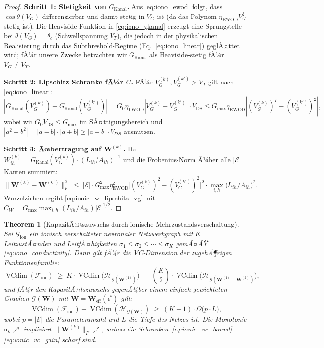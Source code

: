 ﻿\documentclass[12pt, a4paper, openany]{report}
\newtheorem{theorem}{Theorem}[chapter]
\newcommand{\calG}{\mathcal{G}}
\newcommand{\calH}{\mathcal{H}}
\newcommand{\calE}{\mathcal{E}}
\newcommand{\calF}{\mathcal{F}}
\DeclareMathOperator{\VC}{VCdim}
\begin{document}
\begin{proof}
\textbf{Schritt 1: Stetigkeit von $G_{\mathrm{Kanal}}$.}
Aus \eqref{eq:iono_ewod} folgt, dass $\cos\theta(V_G)$ differenzierbar
und damit stetig in $V_G$ ist (da das Polynom $\eta_{\mathrm{EWOD}} V_G^2$
stetig ist).  Die Heaviside-Funktion in \eqref{eq:iono_gkanal} erzeugt
eine Sprungstelle bei $\theta(V_G) = \theta_c$ (Schwellspannung $V_T$),
die jedoch in der physikalischen Realisierung durch das Subthreshold-Regime
(Eq.~\ref{eq:iono_linear}) geglÃ¤ttet wird; fÃ¼r unsere Zwecke betrachten
wir $G_{\mathrm{Kanal}}$ als Heaviside-stetig fÃ¼r $V_G \neq V_T$.

\textbf{Schritt 2: Lipschitz-Schranke fÃ¼r $G$.}
FÃ¼r $V_G^{(k)}, V_G^{(k')} > V_T$ gilt nach \eqref{eq:iono_linear}:
\[
  |G_{\mathrm{Kanal}}(V_G^{(k)}) - G_{\mathrm{Kanal}}(V_G^{(k')})| 
  = G_0 \eta_{\mathrm{EWOD}} |V_G^{(k)} - V_G^{(k')}| \cdot V_\mathrm{DS}
  \leq G_{\max} \eta_{\mathrm{EWOD}} |(V_G^{(k)})^2 - (V_G^{(k')})^2|,
\]
wobei wir $G_0 V_\mathrm{DS} \leq G_{\max}$ im SÃ¤ttigungsbereich
und $|a^2 - b^2| = |a-b| \cdot |a+b| \geq |a-b| \cdot V_{DS}$ ausnutzen.

\textbf{Schritt 3: Ãœbertragung auf $\bm{W}^{(k)}$.}
Da $W^{(k)}_{ih} = G_{\mathrm{Kanal}}(V_G^{(k)}) \cdot (L_{ih}/A_{ih})^{-1}$
und die Frobenius-Norm Ã¼ber alle $|\calE|$ Kanten summiert:
\[
  \|\bm{W}^{(k)} - \bm{W}^{(k')}\|_F^2
  \;\leq\;
  |\calE| \cdot G_{\max}^2 \eta_{\mathrm{EWOD}}^2
  \bigl|(V_G^{(k)})^2 - (V_G^{(k')})^2\bigr|^2
  \cdot \max_{i,h}\bigl(L_{ih}/A_{ih}\bigr)^2.
\]
Wurzelziehen ergibt \eqref{eq:ionic_w_lipschitz_vg} mit
$C_W = G_{\max} \max_{i,h}(L_{ih}/A_{ih}) |\calE|^{1/2}$.
\end{proof}

\begin{theorem}[KapazitÃ¤tszuwachs durch ionische Mehrzustandsverschaltung]
\label{thm:ionic_capacity}
Sei $\calG_{\mathrm{ion}}$ ein ionisch verschalteter neuronaler Netzwerkgraph
mit $K$ LeitzustÃ¤nden und LeitfÃ¤higkeiten $\sigma_1 \leq \sigma_2 \leq
\cdots \leq \sigma_K$ gemÃ¤ÃŸ \eqref{eq:iono_conductivity}.
Dann gilt fÃ¼r die VC-Dimension der zugehÃ¶rigen Funktionenfamilie:
\begin{equation}
  \label{eq:ionic_vc_bound}
  \VC(\calF_{\mathrm{ion}})
  \;\geq\;
  K \cdot \VC\!\bigl(\calH_{\calG(\bm{W}^{(1)})}\bigr)
  \;-\;
  \binom{K}{2} \cdot \VC\!\bigl(\calH_{\calG(\bm{W}^{(1)}\!-\!\bm{W}^{(2)})}\bigr),
\end{equation}
und fÃ¼r den KapazitÃ¤tszuwachs gegenÃ¼ber einem einfach-gewichteten Graphen
$\calG(\bm{W})$ mit $\bm{W} = \bm{W}_{\mathrm{eff}}(\bm{\iota}^*)$ gilt:
\begin{equation}
  \label{eq:ionic_vc_gain}
  \VC(\calF_{\mathrm{ion}}) - \VC(\calH_{\calG(\bm{W})})
  \;\geq\;
  (K-1) \cdot \Omega\!\bigl(p \cdot L\bigr),
\end{equation}
wobei $p = |\calE|$ die Parameteranzahl und $L$ die Tiefe des Netzes ist.
Die Monotonie $\sigma_k \nearrow$ impliziert $\|\bm{W}^{(k)}\|_F \nearrow$,
sodass die Schranken~\eqref{eq:ionic_vc_bound}--\eqref{eq:ionic_vc_gain} scharf sind.
\end{theorem}
\end{document}
